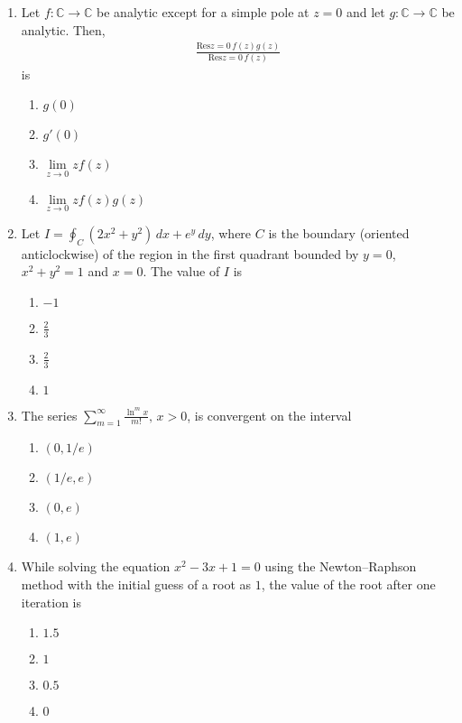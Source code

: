 \documentclass[journal]{IEEEtran}
\numberwithin{equation}{enumi}
\numberwithin{figure}{enumi}
\begin{document}
\begin{enumerate}
\item Let $f : \mathbb{C} \to \mathbb{C}$ be analytic except for a simple pole at $z=0$ and let $g : \mathbb{C} \to \mathbb{C}$ be analytic. Then,
\begin{align*}
\frac{\text{Res}{z=0} \, f(z) g(z)}{\text{Res}{z=0} \, f(z)}
\end{align*}
is
\hfill{}
\begin{multicols}{4}
\begin{enumerate}
    \item $g(0)$
    \item $g'(0)$
    \item $\lim\limits_{z \to 0} z f(z)$
    \item $\lim\limits_{z \to 0} z f(z) g(z)$
\end{enumerate}
\end{multicols}


\item Let $I = \oint_C (2x^2 + y^2) \, dx + e^y \, dy$, where $C$ is the boundary (oriented anticlockwise) of the region in the first quadrant bounded by $y = 0$, $x^2 + y^2 = 1$ and $x = 0$. The value of $I$ is
\hfill{}
\begin{multicols}{4}
\begin{enumerate}
    \item $-1$
    \item $\frac{2}{3}$
    \item $\frac{2}{3}$
    \item $1$
\end{enumerate}
\end{multicols}


\item The series $\sum\limits_{m=1}^{\infty} \frac{\ln^m x}{m!}, \, x > 0$, is convergent on the interval
\hfill{}
\begin{multicols}{4}
\begin{enumerate}
    \item $(0, 1/e)$
    \item $(1/e, e)$ 
    \item $(0, e)$
    \item $(1, e)$
\end{enumerate}
\end{multicols}


\item While solving the equation $x^2 - 3x + 1 = 0$ using the Newton--Raphson method with the initial guess of a root as $1$, the value of the root after one iteration is
\hfill{}
\begin{multicols}{4}
\begin{enumerate}
    \item $1.5$ 
    \item $1$
    \item  $0.5$
    \item $0$
\end{enumerate}
\end{multicols}







\end{enumerate}
\end{document}
